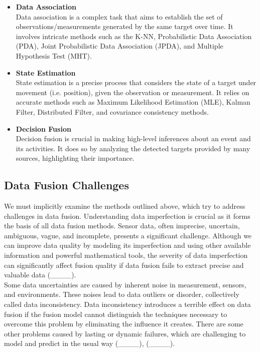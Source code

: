 \begin{enumerate}
\begin{itemize}
    \item\textbf{Data Association} \\Data association is a complex task that aims to establish the set of observations/measurements generated by the same target over time. It involves intricate methods such as the K-NN, Probabilistic Data Association (PDA), Joint Probabilistic Data Association (JPDA), and Multiple Hypothesis Test (MHT).    
    \item\textbf{State Estimation} \\State estimation is a precise process that considers the state of a target under movement (i.e. position), given the observation or measurement. It relies on accurate methods such as Maximum Likelihood Estimation (MLE), Kalman Filter, Distributed Filter, and covariance consistency methods. 
    \item\textbf{Decision Fusion} \\Decision fusion is crucial in making high-level inferences about an event and its activities. It does so by analyzing the detected targets provided by many sources, highlighting their importance.
    \end{itemize}
\end{enumerate}


\subsection{Data Fusion Challenges}
We must implicitly examine the methods outlined above, which try to address challenges in data fusion. 
Understanding data imperfection is crucial as it forms the basis of all data fusion methods. Sensor data, often imprecise, uncertain, ambiguous, vague, and incomplete, presents a significant challenge. Although we can improve data quality by modeling its imperfection and using other available information and powerful mathematical tools, the severity of data imperfection can significantly affect fusion quality if data fusion fails to extract precise and valuable data (____).\\

Some data uncertainties are caused by inherent noise in measurement, sensors, and environments. These noises lead to data outliers or disorder, collectively called data inconsistency.  Data inconsistency introduces a terrible effect on data fusion if the fusion model cannot distinguish the techniques necessary to overcome this problem by eliminating the influence it creates. There are some other problems caused by lasting or dynamic failures, which are challenging to model and predict in the usual way (____), (____).\\

